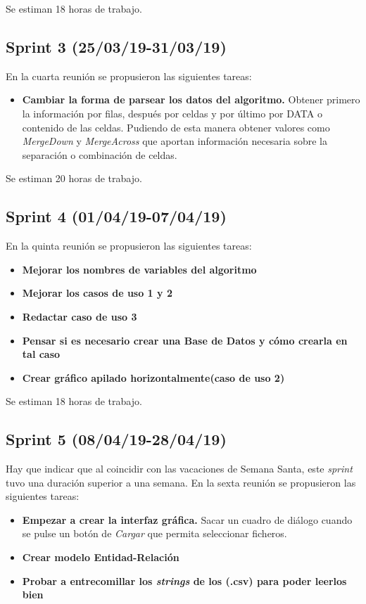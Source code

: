 Se estiman 18 horas de trabajo.

\subsection{Sprint 3 (25/03/19-31/03/19)}
En la cuarta reunión se propusieron las siguientes tareas:

\begin{itemize}
\item
\textbf{Cambiar la forma de parsear los datos del algoritmo.} Obtener primero la información por filas, después por celdas y por último por DATA o contenido de las celdas. Pudiendo de esta manera obtener valores como \emph{MergeDown} y \emph{MergeAcross} que aportan información necesaria sobre la separación o combinación de celdas.   
\end{itemize}

Se estiman 20 horas de trabajo.

\subsection{Sprint 4 (01/04/19-07/04/19)}
En la quinta reunión se propusieron las siguientes tareas:

\begin{itemize}
\item
\textbf{Mejorar los nombres de variables del algoritmo}
\item
\textbf{Mejorar los casos de uso 1 y 2}
\item
\textbf{Redactar caso de uso 3}
\item
\textbf{Pensar si es necesario crear una Base de Datos y cómo crearla en tal caso}
\item
\textbf{Crear gráfico apilado horizontalmente(caso de uso 2)}
\end{itemize}

Se estiman 18 horas de trabajo.

\subsection{Sprint 5 (08/04/19-28/04/19)}
Hay que indicar que al coincidir con las vacaciones de Semana Santa, este \emph{sprint} tuvo una duración superior a una semana. En la sexta reunión se propusieron las siguientes tareas:

\begin{itemize}
\item
\textbf{Empezar a crear la interfaz gráfica.} Sacar un cuadro de diálogo cuando se pulse un botón de \emph{Cargar} que permita seleccionar ficheros.
\item
\textbf{Crear modelo Entidad-Relación}
\item
\textbf{Probar a entrecomillar los \emph{strings} de los (.csv) para poder leerlos bien}
\end{itemize}


